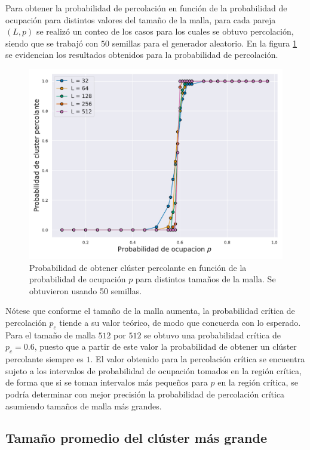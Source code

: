 \documentclass[%
 reprint,
 amsmath,amssymb,
 aps,
]{revtex4-2}
\begin{document}
Para obtener la probabilidad de percolación en función de la probabilidad de ocupación para distintos valores del tamaño de la malla, para cada pareja $(L, p)$ se realizó un conteo de los casos para los cuales se obtuvo percolación, siendo que se trabajó con $50$ semillas para el generador aleatorio. En la figura \ref{fig: probabilidad} se evidencian los resultados obtenidos para la probabilidad de percolación.

\begin{figure}[H]
    \centering
    \includegraphics[width=1\linewidth]{Probabilidadcluster.pdf}
    \caption{Probabilidad de obtener clúster percolante en función de la probabilidad de ocupación $p$ para distintos tamaños de la malla. Se obtuvieron usando 50 semillas.}
    \label{fig: probabilidad}
\end{figure}

Nótese que conforme el tamaño de la malla aumenta, la probabilidad crítica de percolación $p_c$ tiende a su valor teórico, de modo que concuerda con lo esperado. Para el tamaño de malla $512$ por $512$ se obtuvo una probabilidad crítica de $p_c = 0.6$, puesto que a partir de este valor la probabilidad de obtener un clúster percolante siempre es $1$. El valor obtenido para la percolación crítica se encuentra sujeto a los intervalos de probabilidad de ocupación tomados en la región crítica, de forma que si se toman intervalos más pequeños para $p$ en la región crítica, se podría determinar con mejor precisión la probabilidad de percolación crítica asumiendo tamaños de malla más grandes.

\subsection{Tamaño promedio del clúster más grande}
\end{document}
